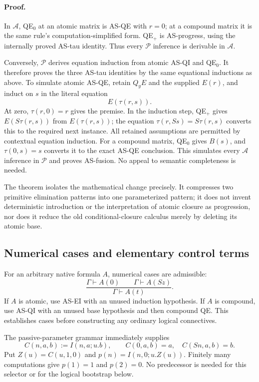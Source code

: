 \paragraph{Proof.}
In $\mathcal A$, QE$_0$ at an atomic matrix is AS-QE with $r=0$;
at a compound matrix it is the same rule's computation-simplified
form. QE$_+$ is AS-progress, using the internally proved AS-tau
identity. Thus every $\mathcal P$ inference is derivable in
$\mathcal A$.

Conversely, $\mathcal P$ derives equation induction from atomic
AS-QI and QE$_0$. It therefore proves the three AS-tau identities
by the same equational inductions as above. To simulate atomic AS-QE,
retain $Q_yE$ and the supplied $E(r)$, and induct on $s$ in the
literal equation
\[
                       E(\tau(r,s)).
\]
At zero, $\tau(r,0)=r$ gives the premise. In the induction step,
QE$_+$ gives $E(S\tau(r,s))$ from $E(\tau(r,s))$; the equation
$\tau(r,Ss)=S\tau(r,s)$ converts this to the required next instance.
All retained assumptions are permitted by contextual equation
induction. For a compound matrix, QE$_0$ gives $B(s)$, and
$\tau(0,s)=s$ converts it to the exact AS-QE conclusion. This
simulates every $\mathcal A$ inference in $\mathcal P$ and proves
AS-fusion. No appeal to semantic completeness is needed.

The theorem isolates the mathematical change precisely. It compresses
two primitive elimination patterns into one parameterized pattern;
it does not invent deterministic introduction or the interpretation
of atomic closure as progression, nor does it reduce the old
conditional-closure calculus merely by deleting its atomic base.

\subsection{Numerical cases and elementary control terms}

For an arbitrary native formula $A$, numerical cases are admissible:
\[
 \frac{\Gamma\vdash A(0)\qquad\Gamma\vdash A(Sz)}
      {\Gamma\vdash A(t)}.
 \tag{AS-NC}
\]
If $A$ is atomic, use AS-EI with an unused induction hypothesis.
If $A$ is compound, use AS-QI with an unused base hypothesis and
then compound QE. This establishes cases before constructing any
ordinary logical connectives.

The passive-parameter grammar immediately supplies
\[
 C(n,a,b):=I(n,a;u.b),\qquad
 C(0,a,b)=a,\quad C(Sn,a,b)=b.
 \tag{AS-C}
\]
Put $Z(u)=C(u,1,0)$ and $p(n)=I(n,0;u.Z(u))$. Finitely many
computations give $p(1)=1$ and $p(2)=0$. No predecessor is needed
for this selector or for the logical bootstrap below.

